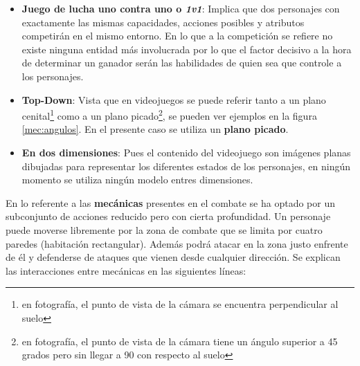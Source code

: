 \begin{itemize}
	\item \textbf{Juego de lucha uno contra uno o \textit{1v1}}: Implica que dos personajes con exactamente las mismas capacidades, acciones posibles y atributos competirán en el mismo entorno. En lo que a la competición se refiere no existe ninguna entidad más involucrada por lo que el factor decisivo a la hora de determinar un ganador serán las habilidades de quien sea que controle a los personajes.
	\item \textbf{Top-Down}: Vista que en videojuegos se puede referir tanto a un plano cenital\footnote{en fotografía, el punto de vista de la cámara se encuentra perpendicular al suelo} como a un plano picado\footnote{en fotografía, el punto de vista de la cámara tiene un ángulo superior a 45 grados pero sin llegar a 90 con respecto al suelo}, se pueden ver ejemplos en la figura \ref{mec:angulos}. En el presente caso se utiliza un \textbf{plano picado}.
	\item \textbf{En dos dimensiones}: Pues el contenido del videojuego son imágenes planas dibujadas para representar los diferentes estados de los personajes, en ningún momento se utiliza ningún modelo entres dimensiones.
\end{itemize}

\bigskip

En lo referente a las \textbf{mecánicas} presentes en el combate se ha optado por un subconjunto de acciones reducido pero con cierta profundidad. Un personaje puede moverse libremente por la zona de combate que se limita por cuatro paredes (habitación rectangular). Además podrá atacar en la zona justo enfrente de él y defenderse de ataques que vienen desde cualquier dirección. Se explican las interacciones entre mecánicas en las siguientes líneas:


